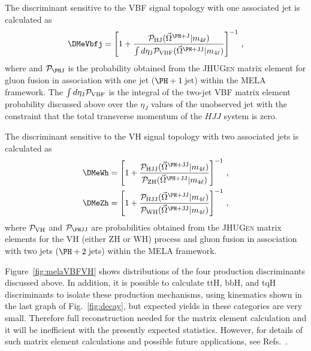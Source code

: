 The discriminant sensitive to the VBF signal topology with one associated jet
is calculated as~\cite{Khachatryan:2015cwa, Khachatryan:2015mma} 
\begin{eqnarray}
%
\label{eq:mela1jet}
\DMeVbfj = 
\left[1+
\frac{ \mathcal{P}_{\rm HJ} (\vec\Omega^{\rm \PH+J} | m_{4\ell}) }
{\int d\eta_{\rm J}\mathcal{P}_{\rm VBF}  (\vec\Omega^{\rm \PH+JJ} | m_{4\ell})  }\right]^{-1}
\,,
%
\end{eqnarray}
where and $\mathcal{P}_{\rm \PH J}$ is the probability obtained from the 
\textsc{JHUGen} matrix element for gluon fusion in association with one jet ($\PH+1$\,jet) within the 
MELA framework.
The $\int d\eta_{\rm J}\mathcal{P}_{\rm VBF}$ is the integral of the two-jet VBF matrix element probability
discussed above over the $\eta_J$ values of the unobserved jet with the constraint that the total 
transverse momentum of the $HJJ$ system is zero. 

The discriminant sensitive to the VH signal topology with two associated jets 
is calculated as~\cite{Khachatryan:2015cwa, Khachatryan:2015mma} 
\begin{eqnarray}
%
\label{eq:zhmela}
\DMeWh = 
\left[1+
\frac{ \mathcal{P}_{\rm HJJ} (\vec\Omega^{\rm \PH+JJ} | m_{4\ell}) }
{\mathcal{P}_{\rm ZH}  (\vec\Omega^{\rm \PH+JJ} | m_{4\ell})  }\right]^{-1}
\,, \\
\label{eq:whmela}
\DMeZh = 
\left[1+
\frac{ \mathcal{P}_{\rm HJJ} (\vec\Omega^{\rm \PH+JJ} | m_{4\ell}) }
{\mathcal{P}_{\rm WH}  (\vec\Omega^{\rm \PH+JJ} | m_{4\ell})  }\right]^{-1}
\,, 
%
\end{eqnarray}
where $\mathcal{P}_{\rm VH}$ and $\mathcal{P}_{\rm \PH JJ}$ are probabilities obtained from the 
\textsc{JHUGen} matrix elements for the VH (either ZH or WH) process and gluon fusion 
in association with two jets ($\PH+2$\,jets) within the MELA framework.

Figure~\ref{fig:melaVBFVH} shows distributions of the four production discriminants discussed above.
In addition, it is possible to calculate ttH, bbH, and tqH discriminants to isolate these production 
mechanisms, using kinematics shown in the last graph of Fig.~\ref{fig:decay}, but expected yields 
in these categories are very small. Therefore full reconstruction needed for the matrix element 
calculation and it will be inefficient with the presently expected statistics. However, for details of such 
matrix element calculations and possible future applications, see Refs.~\cite{AN-16-185,Gritsan:2016hjl}.


